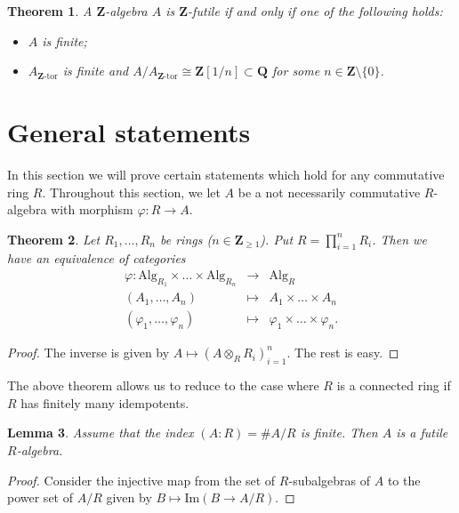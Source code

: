 \documentclass{amsart}
\theoremstyle{plain}
\newtheorem{theorem}{Theorem}[section]
\newtheorem{lemma}[theorem]{Lemma}
\theoremstyle{definition}
\begin{document}
\begin{theorem}
A ${\mathbf{Z}}$-algebra $A$ is ${\mathbf{Z}}$-futile if and only if one of the following holds:
\begin{itemize}
\item $A$ is finite;
\item  $A_{{\mathbf{Z}}\textrm{-}\mathrm{tor}}$ is
finite and
$A/A_{{\mathbf{Z}}\textrm{-}\mathrm{tor}} \cong {\mathbf{Z}}[1/n] \subset {\mathbf{Q}}$ for some $n \in {\mathbf{Z}} \setminus \{0\}$.
\end{itemize}
\end{theorem}

\section{General statements} \label{307}

In this section we will prove certain statements which hold for any commutative ring $R$. Throughout this section, we let $A$ be a not necessarily
commutative $R$-algebra with morphism $\varphi: R \to A$.

\begin{theorem} \label{120}
 Let $R_1,\ldots, R_n$ be rings ($n \in {\mathbf{Z}}_{\geq 1}$). Put $R= \prod_{i=1}^n R_i$. Then we have an equivalence of categories
\begin{eqnarray*}
\varphi: \mathrm{Alg}_{R_1} \times \ldots \times \mathrm{Alg}_{R_n} &\to& \mathrm{Alg}_{R} \\
(A_1,\ldots,A_n) &\mapsto& A_1 \times \ldots \times A_n \\
(\varphi_1, \ldots,\varphi_n) &\mapsto& \varphi_1 \times \ldots \times \varphi_n.
\end{eqnarray*}
\end{theorem}
\begin{proof}
 The inverse is given by $A \mapsto (A \otimes_R R_i)_{i=1}^n$. The rest is easy.
\end{proof}

The above theorem allows us to reduce to the case where $R$ is a connected ring if $R$ has finitely many idempotents.

\begin{lemma}
 Assume that the index $(A:R)=\#A/R$ is finite. Then $A$ is a futile $R$-algebra.
\end{lemma}
\begin{proof}
Consider the injective map from the set of $R$-subalgebras of $A$ to the power set of $A/R$ given by $B \mapsto \mathrm{Im}(B \to
A/R)$.
\end{proof}
\end{document}
